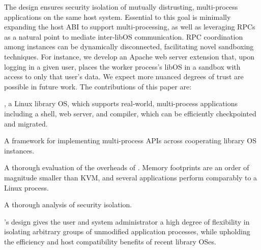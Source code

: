 
The \sysname{} design ensures security isolation of
mutually distrusting, multi-process
applications on the same host system.
Essential to this goal is
minimally expanding the host ABI to support multi-processing,
as well as leveraging RPCs as a natural point to mediate inter-libOS communication.
RPC coordination among \sysname{} instances can be dynamically disconnected, facilitating novel sandboxing
techniques.  For instance, we develop an Apache web server extension that, upon logging in a given user,
places the worker process's libOS in a sandbox with access to only that user's data.
We expect more nuanced degrees of trust are possible in future work.
The contributions of this paper are:
\begin{compactitem}
\item \sysname{}, a Linux library OS, which supports
  real-world, multi-process applications including a shell, web server,
  and compiler, which can be  efficiently checkpointed and migrated.
\item A framework for implementing multi-process APIs across cooperating library OS instances.
\item A thorough evaluation of the overheads of \sysname{}.  Memory footprints are an order of magnitude
smaller than KVM, and several applications perform comparably to a Linux process.
\item A thorough analysis of \sysname{} security isolation.


\end{compactitem}
\sysname{}'s design gives the user and system administrator a high degree of flexibility
in isolating arbitrary groups of unmodified application processes,
while upholding the efficiency and host compatibility benefits of recent library OSes.


